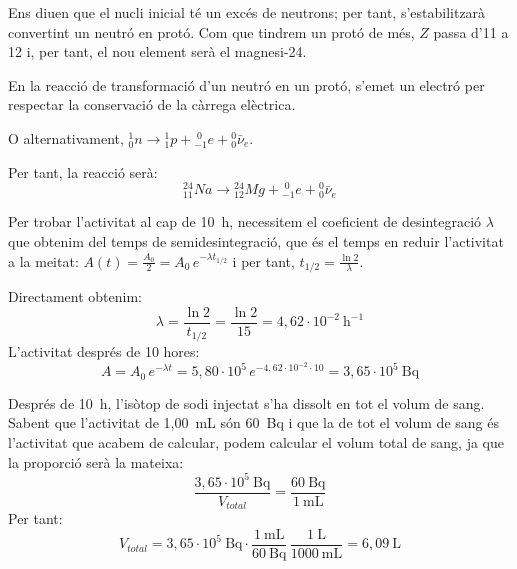 \begin{solapartat}
 Ens diuen que el nucli inicial té un excés de neutrons; per tant, s'estabilitzarà convertint un neutró en protó. Com que tindrem un protó de més, $Z$ passa d'11 a 12 i, per tant, el nou element serà el magnesi-24.

 En la reacció de transformació d'un neutró en un protó, s'emet un electró per respectar la conservació de la càrrega elèctrica.

O alternativament, ${}^{1}_{0}n \to {}^{1}_{1}p + {}^{\;0}_{-1}e + {}^{0}_{0}\bar{\nu}_e$.

Per tant, la reacció serà:
\[ {}^{24}_{11}Na \to {}^{24}_{12}Mg + {}^{\;0}_{-1}e + {}^{0}_{0}\bar{\nu}_e \]
\end{solapartat}

\begin{solapartat}
 Per trobar l'activitat al cap de 10~h, necessitem el coeficient de desintegració $\lambda$ que obtenim del temps de semidesintegració, que és el temps en reduir l'activitat a la meitat: $A(t) = \frac{A_0}{2} = A_0\,e^{-\lambda t_{1/2}}$ i per tant, $t_{1/2} = \frac{\ln 2}{\lambda}$.

Directament obtenim:
\[ \lambda = \frac{\ln 2}{t_{1/2}} = \frac{\ln 2}{15} = 4,62\cdot 10^{-2}\ \mathrm{h^{-1}} \]
L'activitat després de 10 hores:
\[ A = A_0\,e^{-\lambda t} = 5,80\cdot 10^{5}\,e^{-4,62\cdot 10^{-2}\cdot 10} = 3,65\cdot 10^{5}\ \mathrm{Bq} \]

 Després de 10~h, l'isòtop de sodi injectat s'ha dissolt en tot el volum de sang. Sabent que l'activitat de 1,00~mL són 60~Bq i que la de tot el volum de sang és l'activitat que acabem de calcular, podem calcular el volum total de sang, ja que la proporció serà la mateixa:
\[ \frac{3,65\cdot 10^{5}\ \mathrm{Bq}}{V_{total}} = \frac{60\ \mathrm{Bq}}{1\ \mathrm{mL}} \]
Per tant:
\[ V_{total} = 3,65\cdot 10^{5}\ \mathrm{Bq}\cdot\frac{1\ \mathrm{mL}}{60\ \mathrm{Bq}}\,\frac{1\ \mathrm{L}}{1000\ \mathrm{mL}} = 6,09\ \mathrm{L} \]
\end{solapartat}
